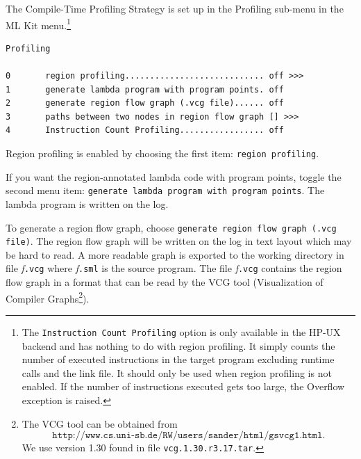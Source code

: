 \documentclass[12pt]{book}
\begin{document}
The Compile-Time Profiling Strategy is set up in the Profiling
sub-menu in the
ML Kit menu.\footnote{The \texttt{Instruction Count
    Profiling} option is only available in the HP-UX backend and has
  nothing to do with region profiling. It simply counts the number of
  executed instructions in the target program excluding runtime calls and
  the link file. It should only be used when region profiling is not
  enabled. If the number of instructions executed gets too large, the
  Overflow exception is raised.}

\begin{verbatim}
Profiling

0       region profiling............................ off >>>
1       generate lambda program with program points. off
2       generate region flow graph (.vcg file)...... off
3       paths between two nodes in region flow graph [] >>>
4       Instruction Count Profiling................. off
\end{verbatim}
\noindent
Region profiling is enabled by choosing the first item:
\mbox{\texttt{region profiling}}.

If you want the region-annotated lambda code with program points, toggle
the second menu item: \texttt{generate lambda program with program
  points}.  The lambda program is written on the log.

To generate a region flow graph, choose \texttt{generate region flow graph
  (.vcg file)}. The region flow
graph will be written on the log in text layout which may be hard to read.
A more readable graph is exported to the working directory in file
\emph{f}\texttt{.vcg} where \emph{f}\texttt{.sml} is the source program.
The file \emph{f}\texttt{.vcg} contains the region flow graph in a format
that can be read by the VCG tool (Visualization of Compiler
Graphs\footnote{The VCG tool can be obtained from
  \[\texttt{http://www.cs.uni-sb.de/RW/users/sander/html/gsvcg1.html}.\]
  We use version 1.30 found in file \texttt{vcg.1.30.r3.17.tar}.}).
\end{document}
